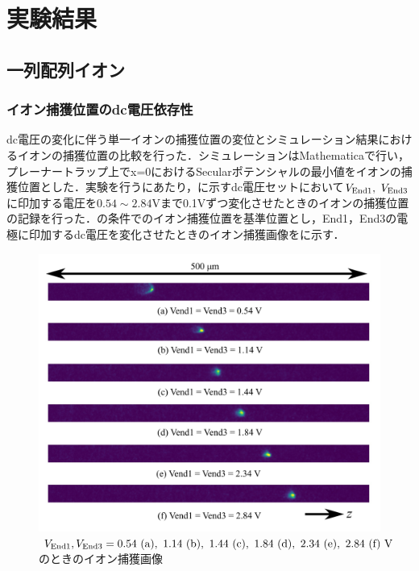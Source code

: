 \chapter{実験結果}
\section{一列配列イオン}
\subsection{イオン捕獲位置のdc電圧依存性}
dc電圧の変化に伴う単一イオンの捕獲位置の変位とシミュレーション結果におけるイオンの捕獲位置の比較を行った．シミュレーションはMathematicaで行い，プレーナートラップ上でx=0におけるSecularポテンシャルの最小値をイオンの捕獲位置とした．実験を行うにあたり，に示すdc電圧セットにおいて$V_{\rm End1}, \ V_{\rm End3}$に印加する電圧を$0.54 \sim 2.84$Vまで0.1Vずつ変化させたときのイオンの捕獲位置の記録を行った．の条件でのイオン捕獲位置を基準位置とし，End1，End3の電極に印加するdc電圧を変化させたときのイオン捕獲画像をに示す．
\begin{figure}[h]
	\begin{center}
		\includegraphics[scale = 0.7]{./results/figure/displacement_End_Odd.png}
		\caption{$V_{\rm End1}, V_{\rm End3} = 0.54{\rm \ (a)}, \ 1.14{\rm \ (b)}, \ 1.44{\rm \ (c)}, \ 1.84{\rm \ (d)}, \ 2.34{\rm \ (e)}, \ 2.84{\rm \ (f)} \ {\rm V}$のときのイオン捕獲画像}
		\label{fig:displacement_End13}
	\end{center}
\end{figure}

